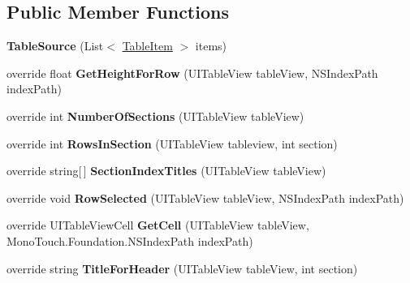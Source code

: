 \subsection*{Public Member Functions}
\begin{DoxyCompactItemize}
\item 
\hypertarget{class_pro_scan_mobile_1_1_table_source_aea9d2890a231e8bc819ef9b8989e2dcc}{{\bfseries Table\-Source} (List$<$ \hyperlink{class_pro_scan_mobile_1_1_table_item}{Table\-Item} $>$ items)}\label{class_pro_scan_mobile_1_1_table_source_aea9d2890a231e8bc819ef9b8989e2dcc}

\item 
\hypertarget{class_pro_scan_mobile_1_1_table_source_aff20e61bd340d0d4157f35da3930b646}{override float {\bfseries Get\-Height\-For\-Row} (U\-I\-Table\-View table\-View, N\-S\-Index\-Path index\-Path)}\label{class_pro_scan_mobile_1_1_table_source_aff20e61bd340d0d4157f35da3930b646}

\item 
\hypertarget{class_pro_scan_mobile_1_1_table_source_afb668953eb791c24d3d62949c38cf6dd}{override int {\bfseries Number\-Of\-Sections} (U\-I\-Table\-View table\-View)}\label{class_pro_scan_mobile_1_1_table_source_afb668953eb791c24d3d62949c38cf6dd}

\item 
\hypertarget{class_pro_scan_mobile_1_1_table_source_ade5aa9ad327a4cf7d5dc578cce50ce36}{override int {\bfseries Rows\-In\-Section} (U\-I\-Table\-View tableview, int section)}\label{class_pro_scan_mobile_1_1_table_source_ade5aa9ad327a4cf7d5dc578cce50ce36}

\item 
\hypertarget{class_pro_scan_mobile_1_1_table_source_a59cdeadc2db679679dae23b790b9f14b}{override string\mbox{[}$\,$\mbox{]} {\bfseries Section\-Index\-Titles} (U\-I\-Table\-View table\-View)}\label{class_pro_scan_mobile_1_1_table_source_a59cdeadc2db679679dae23b790b9f14b}

\item 
\hypertarget{class_pro_scan_mobile_1_1_table_source_a3105b26a6d5538b3cba5dbffd2aa11a0}{override void {\bfseries Row\-Selected} (U\-I\-Table\-View table\-View, N\-S\-Index\-Path index\-Path)}\label{class_pro_scan_mobile_1_1_table_source_a3105b26a6d5538b3cba5dbffd2aa11a0}

\item 
\hypertarget{class_pro_scan_mobile_1_1_table_source_a87cd41961f9a62200c8d198bd203e955}{override U\-I\-Table\-View\-Cell {\bfseries Get\-Cell} (U\-I\-Table\-View table\-View, Mono\-Touch.\-Foundation.\-N\-S\-Index\-Path index\-Path)}\label{class_pro_scan_mobile_1_1_table_source_a87cd41961f9a62200c8d198bd203e955}

\item 
\hypertarget{class_pro_scan_mobile_1_1_table_source_aee1a5f3bbe5f3916bdfa6b5a267b41bc}{override string {\bfseries Title\-For\-Header} (U\-I\-Table\-View table\-View, int section)}\label{class_pro_scan_mobile_1_1_table_source_aee1a5f3bbe5f3916bdfa6b5a267b41bc}

\end{DoxyCompactItemize}


